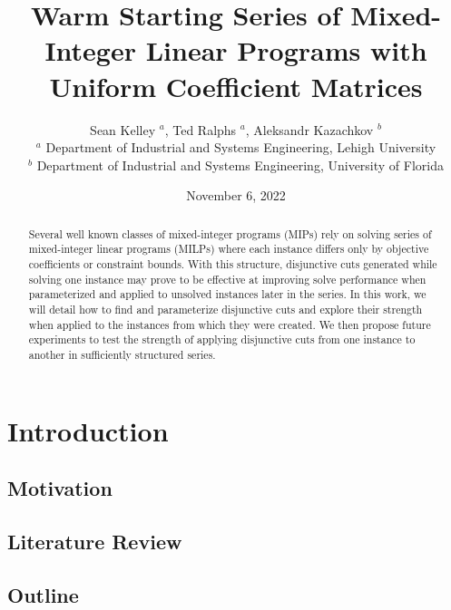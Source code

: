 \documentclass[10pt]{article}
\begin{document}
	\title{Warm Starting Series of Mixed-Integer Linear Programs with Uniform Coefficient Matrices}
	\author{Sean Kelley $^a$, Ted Ralphs $ ^a $, Aleksandr Kazachkov $ ^b $ \\
		$^a$ Department of Industrial and Systems Engineering, Lehigh University \\
		$^b$ Department of Industrial and Systems Engineering, University of Florida}
	\date{November 6, 2022}
	\maketitle
	
	\bigskip
	
	\begin{abstract}
		Several well known classes of mixed-integer programs (MIPs) rely on solving series of mixed-integer linear programs (MILPs) where each instance differs only by objective coefficients or constraint bounds. With this structure, disjunctive cuts generated while solving one instance may prove to be effective at improving solve performance when parameterized and applied to unsolved instances later in the series. In this work, we will detail how to find and parameterize disjunctive cuts and explore their strength when applied to the instances from which they were created. We then propose future experiments to test the strength of applying disjunctive cuts from one instance to another in sufficiently structured series.
	\end{abstract}
	
	\section{Introduction} \label{s:intro}
	
	\subsection{Motivation}	\label{ss:motivation}
	
	\subsection{Literature Review}	\label{ss:lit_review}
	
	\subsection{Outline} \label{ss:outline}
	
\end{document}
